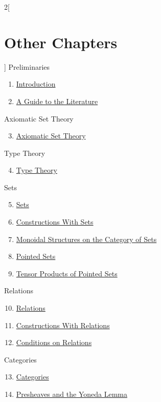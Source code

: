 \begin{multicols}{2}[\section{Other Chapters}]
\noindent
Preliminaries
\begin{enumerate}
\item \hyperref[introduction:section-phantom]{Introduction}
\item \hyperref[a-guide-to-the-literature:section-phantom]{A Guide to the Literature}
\end{enumerate}
Axiomatic Set Theory
\begin{enumerate}
\setcounter{enumi}{2}
\item \hyperref[axiomatic-set-theory:section-phantom]{Axiomatic Set Theory}
\end{enumerate}
Type Theory
\begin{enumerate}
\setcounter{enumi}{3}
\item \hyperref[type-theory:section-phantom]{Type Theory}
\end{enumerate}
Sets
\begin{enumerate}
\setcounter{enumi}{4}
\item \hyperref[sets:section-phantom]{Sets}
\item \hyperref[constructions-with-sets:section-phantom]{Constructions With Sets}
\item \hyperref[monoidal-structures-on-the-category-of-sets:section-phantom]{Monoidal Structures on the Category of Sets}
\item \hyperref[pointed-sets:section-phantom]{Pointed Sets}
\item \hyperref[tensor-products-of-pointed-sets:section-phantom]{Tensor Products of Pointed Sets}
\end{enumerate}
Relations
\begin{enumerate}
\setcounter{enumi}{9}
\item \hyperref[relations:section-phantom]{Relations}
\item \hyperref[constructions-with-relations:section-phantom]{Constructions With Relations}
\item \hyperref[conditions-on-relations:section-phantom]{Conditions on Relations}
\end{enumerate}
Categories
\begin{enumerate}
\setcounter{enumi}{12}
\item \hyperref[categories:section-phantom]{Categories}
\item \hyperref[presheaves-and-the-yoneda-lemma:section-phantom]{Presheaves and the Yoneda Lemma}

\end{enumerate}
\end{multicols}
